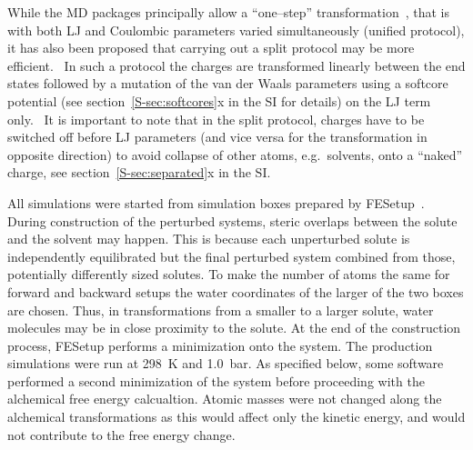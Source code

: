\documentclass[journal=jctcce,manuscript=article]{achemso}
\begin{document}
While the MD packages principally allow a ``one--step''
transformation~\cite{steinbrecher_soft-core_2011},
that is with both LJ and Coulombic parameters varied
simultaneously (unified protocol), it has also been proposed that carrying out a
split protocol may be more efficient.~\cite{Deng-2004, naden_linear_2014, naden_linear_2015}
In such a protocol the charges are transformed
linearly between the end states followed by a mutation of the van der
Waals parameters using a softcore
potential (see section~\ref{S-sec:softcores}x in the
SI for details) on the LJ term only.~\cite{beutler_avoiding_1994,
  zacharias_separationshifted_1994}  It is important to note that in the split protocol, charges have to be switched off before LJ parameters (and vice versa
for the transformation in opposite direction) to avoid collapse of
other atoms, e.g.\ solvents, onto a ``naked''
charge,\cite{pitera_comparison_2002, anwar_robust_2005,
steinbrecher_soft-core_2011} see section~\ref{S-sec:separated}x in the SI.

All simulations were started from simulation boxes prepared by
FESetup~\cite{loeffler_fesetup:_2015}.  During construction of the
perturbed systems, steric overlaps between the solute and the
solvent may happen.  This is because each unperturbed solute is independently
equilibrated but the final perturbed system combined from those, potentially
differently sized solutes.  To make the number of atoms the same for forward
and backward setups the water coordinates of the larger of the two boxes are
chosen.  Thus, in transformations from a smaller to a larger solute, water
molecules may be in close proximity to the solute. At the end of the construction process,
FESetup performs a minimization onto the system.
The production simulations
were run at \SI{298}{K} and \SI{1.0}{bar}. As specified below, some software performed
a second minimization of the system before proceeding with the alchemical free energy calcualtion.
Atomic masses were not
changed along the alchemical transformations as this would affect only
the kinetic energy, and would not contribute to the free energy
change.

%
\end{document}
